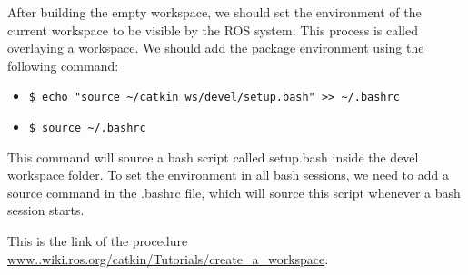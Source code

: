  After building the empty workspace, we should set the environment of the current workspace to be visible by the ROS system.
 This process is called overlaying a workspace. We should add the package environment using the following command:
 \begin{itemize}
 	\item \lstinline|$ echo "source ~/catkin_ws/devel/setup.bash" >> ~/.bashrc |
 	\item \lstinline|$ source ~/.bashrc|
 \end{itemize}
 This command will source a bash script called setup.bash inside the devel workspace folder. To set the environment in all bash sessions, we need to add a source command in the .bashrc file, which will source this script whenever a bash session starts.
 
 This is the link of the procedure \url{www..wiki.ros.org/catkin/Tutorials/create\_a\_workspace}.
 
